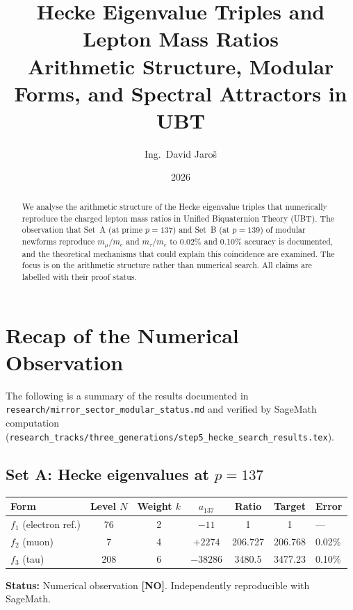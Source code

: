 \documentclass[11pt,a4paper]{article}
\title{Hecke Eigenvalue Triples and Lepton Mass Ratios\\
\large Arithmetic Structure, Modular Forms, and Spectral Attractors in UBT}
\author{Ing.\ David Jaroš}
\date{2026}
\begin{document}
\maketitle

\begin{abstract}
We analyse the arithmetic structure of the Hecke eigenvalue triples that
numerically reproduce the charged lepton mass ratios in Unified Biquaternion
Theory (UBT).  The observation that Set~A (at prime $p = 137$) and Set~B
(at $p = 139$) of modular newforms reproduce $m_\mu/m_e$ and $m_\tau/m_e$
to 0.02\% and 0.10\% accuracy is documented, and the theoretical mechanisms
that could explain this coincidence are examined.  The focus is on the
arithmetic structure rather than numerical search.
All claims are labelled with their proof status.
\end{abstract}

\tableofcontents

\section{Recap of the Numerical Observation}
\label{sec:data}

The following is a summary of the results documented in
\texttt{research/mirror\_sector\_modular\_status.md} and verified by
SageMath computation (\texttt{research\_tracks/three\_generations/step5\_hecke\_search\_results.tex}).

\subsection{Set A: Hecke eigenvalues at $p = 137$}

\begin{center}
\begin{tabular}{lccccc}
\hline
Form & Level $N$ & Weight $k$ & $a_{137}$ & Ratio & Target & Error \\
\hline
$f_1$ (electron ref.) & 76 & 2 & $-11$ & 1 & 1 & — \\
$f_2$ (muon) & 7 & 4 & $+2274$ & 206.727 & 206.768 & 0.02\% \\
$f_3$ (tau) & 208 & 6 & $-38286$ & 3480.5 & 3477.23 & 0.10\% \\
\hline
\end{tabular}
\end{center}

\textbf{Status:} Numerical observation \textbf{[NO]}.  Independently
reproducible with SageMath.
\end{document}
